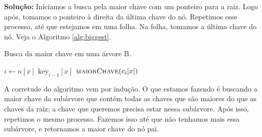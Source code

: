 \textbf{Solução:}
Iniciamos a busca pela maior chave com um ponteiro para a raiz. Logo após, tomamos o ponteiro à direita da última chave do nó. Repetimos esse processo, até que estejamos em uma folha. Na folha, tomamos a última chave do nó. Veja o Algoritmo \ref{alg:biggest}.

\begin{algorithm}
    \caption{Busca da maior chave em uma árvore B.}
    \label{alg:biggest}
    \begin{algorithmic}
            \State $i \gets n[x]$ 
             
                \State \Return $\text{key}_{i-1}[x]$ 
            \Else
                \State \Return $\textsc{maiorChave}(c_i[x])$ 
            \EndIf
        \EndProcedure
    \end{algorithmic}
\end{algorithm}

A corretude do algoritmo vem por indução. O que estamos fazendo é buscando a maior chave da subárvore que contém todas as chaves que são maiores do que as chaves da raiz; a chave que queremos precisa estar nessa subárvore. Após isso, repetimos o mesmo processo. Fazemos isso até que não tenhamos mais essa subárvore, e retornamos a maior chave do nó pai.
